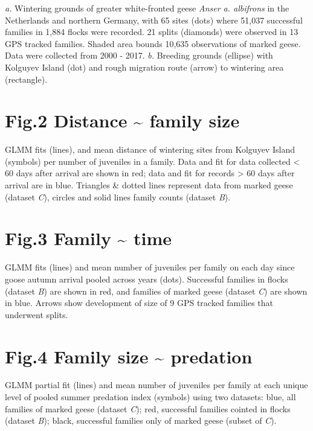 \documentclass[]{article}
\date{}
\begin{document}
\emph{a.} Wintering grounds of greater white-fronted geese \emph{Anser
a. albifrons} in the Netherlands and northern Germany, with 65 sites
(dots) where 51,037 successful families in 1,884 flocks were recorded.
21 splits (diamonds) were observed in 13 GPS tracked families. Shaded
area bounds 10,635 observations of marked geese. Data were collected
from 2000 - 2017. \emph{b.} Breeding grounds (ellipse) with Kolguyev
Island (dot) and rough migration route (arrow) to wintering area
(rectangle).

\section{Fig.2 Distance \textasciitilde{} family
size}\label{fig.2-distance-family-size}

GLMM fits (lines), and mean distance of wintering sites from Kolguyev
Island (symbols) per number of juveniles in a family. Data and fit for
data collected \textless{} 60 days after arrival are shown in red; data
and fit for records \textgreater{} 60 days after arrival are in blue.
Triangles \& dotted lines represent data from marked geese (dataset
\emph{C}), circles and solid lines family counts (dataset \emph{B}).

\section{Fig.3 Family \textasciitilde{} time}\label{fig.3-family-time}

GLMM fits (lines) and mean number of juveniles per family on each day since goose autumn arrival pooled across years (dots). Successful families in flocks (dataset \emph{B}) are shown in red, and families of
marked geese (dataset \emph{C}) are shown in blue. Arrows show development of size of 9 GPS tracked families that underwent splits.

\section{Fig.4 Family size \textasciitilde{}
predation}\label{fig.4-family-size-predation}

GLMM partial fit (lines) and mean number of juveniles per family at each
unique level of pooled summer predation index (symbols) using two
datasets: blue, all families of marked geese (dataset \emph{C}); red,
successful families cointed in flocks (dataset \emph{B}); black,
successful families only of marked geese (subset of \emph{C}).
\end{document}
